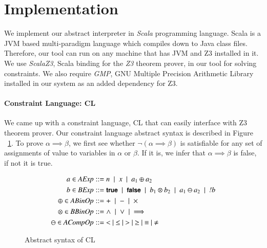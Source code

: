 \section{Implementation}
We implement our abstract interpreter in \emph{Scala} programming language. Scala is a JVM based multi-paradigm language which compiles down to Java class files. Therefore, our tool can run on any machine that has JVM and Z3 installed in it. We use \emph{ScalaZ3}\cite{ScalaZ3}, Scala binding for the \emph{Z3} theorem prover, in our tool for solving constraints. We also require \emph{GMP}, GNU Multiple Precision Arithmetic Library installed in our system as an added dependency for Z3.
\paragraph{Constraint Language: CL}
We came up with a constraint language, CL that can easily interface with Z3 theorem prover. Our constraint language abstract syntax is described in Figure ~\ref{fig:cl}. To prove $\alpha \implies \beta$, we first see whether $\neg(\alpha \implies \beta)$ is satisfiable for any set of assignments of value to variables in $\alpha$ or $\beta$. If it is, we infer that $\alpha \implies \beta$ is false, if not it is true.
\begin{figure}
  \begin{align*}
    a \in \textit{AExp} &::= n \ \mid\  x \ \mid\  a_1 \oplus a_2
    \\
    b \in \textit{BExp} &::= \mbox{\sffamily{\bfseries\small {true}}} \ \mid\  \mbox{\sffamily{\bfseries\small {false}}} \ \mid\  b_1 \otimes b_2 \ \mid\  a_1 \ominus a_2 \ \mid\  \textit{!b}
    \\
    \oplus \in \textit{ABinOp} &::= + \ \mid\  - \ \mid\  \times\\
    \otimes \in \textit{BBinOp} &::= \land \ \mid\  \lor \ \mid\  \implies\\
    \ominus \in \textit{ACompOp} &::=\ < \ \mid\  \leq \ \mid\  > \ \mid\  \geq \ \mid\  \equiv \ \mid\  \neq
  \end{align*}
\caption{Abstract syntax of CL}
\label{fig:cl}
\end{figure}